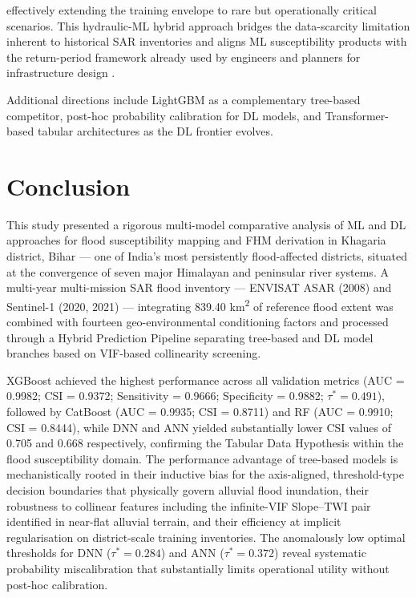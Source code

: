 \documentclass[12pt, a4paper]{article}
\begin{document}
effectively extending the training envelope to rare but operationally critical scenarios. This hydraulic-ML hybrid approach bridges the data-scarcity limitation inherent to historical SAR inventories and aligns ML susceptibility products with the return-period framework already used by engineers and planners for infrastructure design \citep{neal2021, teng2017}.

Additional directions include LightGBM \citep{ke2017} as a complementary tree-based competitor, post-hoc probability calibration for DL models, and Transformer-based tabular architectures \citep{Gorishniy2021} as the DL frontier evolves.

\section{Conclusion}

This study presented a rigorous multi-model comparative analysis of ML and DL approaches for flood susceptibility mapping and FHM derivation in Khagaria district, Bihar --- one of India's most persistently flood-affected districts, situated at the convergence of seven major Himalayan and peninsular river systems. A multi-year multi-mission SAR flood inventory --- ENVISAT ASAR (2008) and Sentinel-1 (2020, 2021) --- integrating 839.40 km\textsuperscript{2} of reference flood extent was combined with fourteen geo-environmental conditioning factors and processed through a Hybrid Prediction Pipeline separating tree-based and DL model branches based on VIF-based collinearity screening.

XGBoost achieved the highest performance across all validation metrics (AUC = 0.9982; CSI = 0.9372; Sensitivity = 0.9666; Specificity = 0.9882; $\tau^* = 0.491$), followed by CatBoost (AUC = 0.9935; CSI = 0.8711) and RF (AUC = 0.9910; CSI = 0.8444), while DNN and ANN yielded substantially lower CSI values of 0.705 and 0.668 respectively, confirming the Tabular Data Hypothesis within the flood susceptibility domain. The performance advantage of tree-based models is mechanistically rooted in their inductive bias for the axis-aligned, threshold-type decision boundaries that physically govern alluvial flood inundation, their robustness to collinear features including the infinite-VIF Slope--TWI pair identified in near-flat alluvial terrain, and their efficiency at implicit regularisation on district-scale training inventories. The anomalously low optimal thresholds for DNN ($\tau^* = 0.284$) and ANN ($\tau^* = 0.372$) reveal systematic probability miscalibration that substantially limits operational utility without post-hoc calibration.
\end{document}
